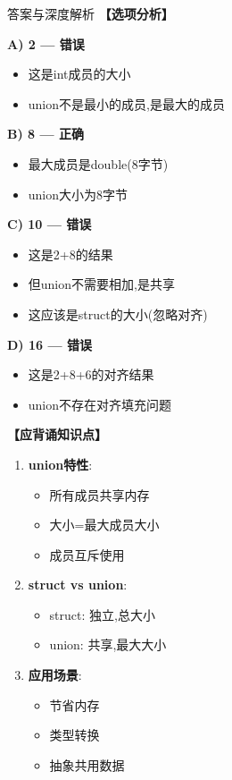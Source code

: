 \documentclass[a4paper,12pt]{article}
\begin{document}
\begin{enumerate}
\begin{bluebox}{答案与深度解析}
	\textbf{【选项分析】}

	\textbf{A) 2 — 错误}
	\begin{itemize}[leftmargin=*, nosep]
		\item 这是int成员的大小
		\item union不是最小的成员,是最大的成员
	\end{itemize}

	\textbf{B) 8 — 正确}
	\begin{itemize}[leftmargin=*, nosep]
		\item 最大成员是double(8字节)
		\item union大小为8字节
	\end{itemize}

	\textbf{C) 10 — 错误}
	\begin{itemize}[leftmargin=*, nosep]
		\item 这是2+8的结果
		\item 但union不需要相加,是共享
		\item 这应该是struct的大小(忽略对齐)
	\end{itemize}

	\textbf{D) 16 — 错误}
	\begin{itemize}[leftmargin=*, nosep]
		\item 这是2+8+6的对齐结果
		\item union不存在对齐填充问题
	\end{itemize}

	\textbf{【应背诵知识点】}

	\begin{enumerate}[leftmargin=*, nosep]
		\item \textbf{union特性}:
		      \begin{itemize}
			      \item 所有成员共享内存
			      \item 大小=最大成员大小
			      \item 成员互斥使用
		      \end{itemize}

		\item \textbf{struct vs union}:
		      \begin{itemize}
			      \item struct: 独立,总大小
			      \item union: 共享,最大大小
		      \end{itemize}

		\item \textbf{应用场景}:
		      \begin{itemize}
			      \item 节省内存
			      \item 类型转换
			      \item 抽象共用数据
		      \end{itemize}
	\end{enumerate}


\end{bluebox}
\end{enumerate}
\end{document}
